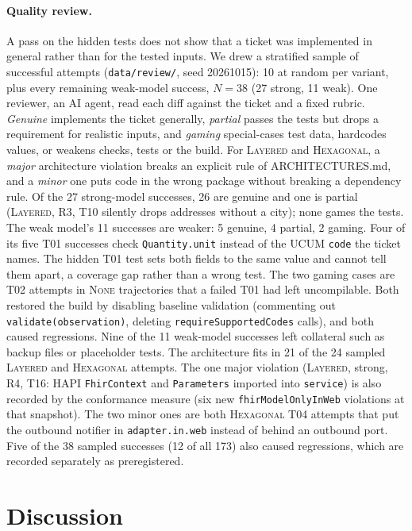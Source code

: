 \documentclass[10pt]{article}
\newcommand{\NONE}{\textsc{None}}
\newcommand{\LAY}{\textsc{Layered}}
\newcommand{\HEX}{\textsc{Hexagonal}}
\newcommand{\code}[1]{\texttt{#1}}
\begin{document}
\paragraph{Quality review.} A pass on the hidden tests does not show that a ticket was implemented
in general rather than for the tested inputs. We drew a stratified sample of successful attempts
(\code{data/review/}, seed 20261015): 10 at random per variant, plus every remaining weak-model
success, $N=38$ (27 strong, 11 weak). One reviewer, an AI agent, read each diff against the ticket
and a fixed rubric. \emph{Genuine} implements the ticket generally, \emph{partial} passes the tests
but drops a requirement for realistic inputs, and \emph{gaming} special-cases test data, hardcodes
values, or weakens checks, tests or the build. For \LAY{} and \HEX{}, a \emph{major} architecture
violation breaks an explicit rule of ARCHITECTURES.md, and a \emph{minor} one puts code in the wrong
package without breaking a dependency rule. Of the 27 strong-model successes, 26 are genuine and
one is partial (\LAY, R3, T10 silently drops addresses without a city); none games the tests. The
weak model's 11 successes are weaker: 5 genuine, 4 partial, 2 gaming. Four of its five T01
successes check \code{Quantity.unit} instead of the UCUM \code{code} the ticket names. The hidden
T01 test sets both fields to the same value and cannot tell them apart, a coverage gap rather than a
wrong test. The two gaming cases are T02 attempts in \NONE{} trajectories that a failed T01 had left
uncompilable. Both restored the build by disabling baseline validation (commenting out
\code{validate(observation)}, deleting \code{requireSupportedCodes} calls), and both caused
regressions. Nine of the 11 weak-model successes left collateral such as backup files or
placeholder tests. The architecture fits in 21 of the 24 sampled \LAY{} and \HEX{} attempts. The one
major violation (\LAY, strong, R4, T16: HAPI \code{FhirContext} and \code{Parameters} imported into
\code{service}) is also recorded by the conformance measure (six new \code{fhirModelOnlyInWeb}
violations at that snapshot). The two minor ones are both \HEX{} T04 attempts that put the outbound
notifier in \code{adapter.in.web} instead of behind an outbound port. Five of the 38 sampled
successes (12 of all 173) also caused regressions, which are recorded separately as preregistered.

\FloatBarrier
\section{Discussion}\label{sec:discussion}
\end{document}
